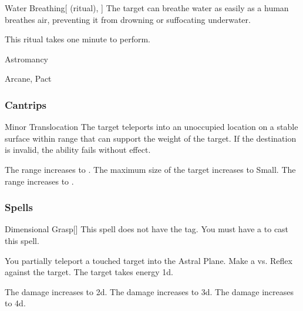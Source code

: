 \lowercase{\hypertarget{spell:Water Breathing}{}}\label{spell:Water Breathing}
\begin{attuneability}[Rank 3]{\hypertarget{spell:Water Breathing}{Water Breathing}}[ (ritual), ]
The target can breathe water as easily as a human breathes air, preventing it from drowning or suffocating underwater.

This ritual takes one minute to perform.
\end{attuneability}
\vspace{0.25em}


\newpage
\begin{spellsection}{Astromancy}

\begin{spellheader}
\end{spellheader}


 Arcane, Pact

\subsubsection{Cantrips}


\begin{freeability}{Minor Translocation}
The target teleports into an unoccupied location on a stable surface within range that can support the weight of the target.
If the destination is invalid, the ability fails without effect.

\rankline
{} The range increases to \rngmed.
 The maximum size of the target increases to Small.
 The range increases to \rnglong.
\end{freeability}

\end{spellsection}


\subsubsection{Spells}


\lowercase{\hypertarget{spell:Dimensional Grasp}{}}\label{spell:Dimensional Grasp}
\begin{freeability}[Rank 1]{\hypertarget{spell:Dimensional Grasp}{Dimensional Grasp}}[]
This spell does not have the  tag.
You must have a  to cast this spell.

You partially teleport a touched target into the Astral Plane.
Make a  vs. Reflex against the target.
\hit The target takes energy  \plus1d.

\rankline
{} The damage increases to  \plus2d.
 The damage increases to  \plus3d.
 The damage increases to  \plus4d.
\end{freeability}
\vspace{0.25em}



